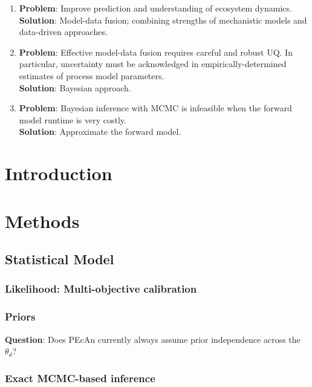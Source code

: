 \documentclass[12pt]{article}
\begin{document}
\begin{enumerate}
\item \textbf{Problem}: Improve prediction and understanding of ecosystem dynamics. \\
	\textbf{Solution}: Model-data fusion; combining strengths of mechanistic models and data-driven approaches. 
\item \textbf{Problem}: Effective model-data fusion requires careful and robust UQ. In particular, uncertainty must be acknowledged in empirically-determined estimates of process model parameters. \\
\textbf{Solution}: Bayesian approach. 
\item \textbf{Problem}: Bayesian inference with MCMC is infeasible when the forward model runtime is very costly. \\
\textbf{Solution}: Approximate the forward model. 
\end{enumerate}

\section{Introduction}

\section{Methods}

\subsection{Statistical Model}
\subsubsection{Likelihood: Multi-objective calibration}

\subsubsection{Priors}

\bigskip
\noindent
\textbf{Question}: Does PEcAn currently always assume prior independence across the $\theta_d$? 

\subsubsection{Exact MCMC-based inference}
\end{document}
